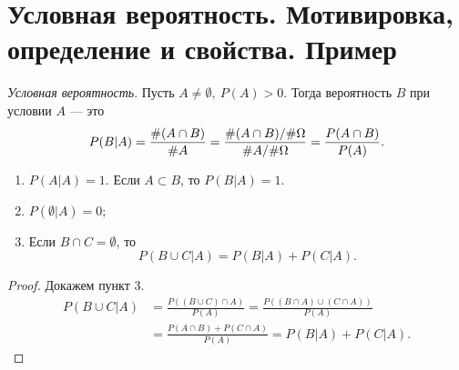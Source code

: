 \section{Условная вероятность. Мотивировка, определение и свойства. Пример}

\begin{definition} \textit{Условная вероятность}. Пусть $A \neq \emptyset, \ P(A) > 0$. Тогда вероятность $B$ при условии $A$ --- это
    $$P(B|A) = \frac{\#(A\cap B)}{\#A} = \frac{\#(A\cap B)/\#\Omega}{\#A/\#\Omega} = \frac{P(A\cap B)}{P(A)}.$$
\end{definition}

\begin{properties}
\enewline
    \begin{enumerate}
        \item $P(A|A) = 1$.
             Если $A \subset B$, то $P(B|A) = 1$.
        \item $P(\emptyset|A) = 0$;
        \item Если $B \cap C = \emptyset$, то
              $$P(B \cup C| A) = P(B|A)+P(C|A).$$
    \end{enumerate}
\end{properties}


\begin{proof} Докажем пункт 3.
\begin{align*}
    P(B\cup C| A) &= \frac{P((B \cup C)\cap A)}{P(A)} = \frac{P((B \cap A)\cup(C \cap A))}{P(A)} \\&= \frac{P(A\cap B)+P(C\cap A)}{P(A)} = P(B|A) + P(C|A).
\end{align*}
    
\end{proof}